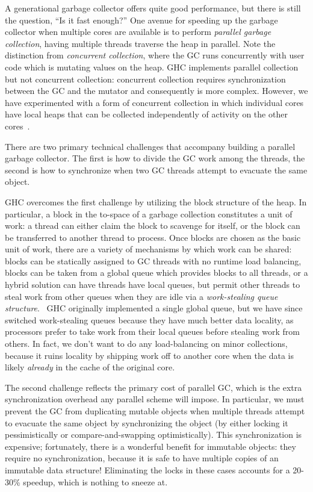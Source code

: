 A generational garbage collector offers quite good performance, but
there is still the question, ``Is it fast enough?''  One avenue for
speeding up the garbage collector when multiple cores are available is
to perform \emph{parallel garbage collection}, having multiple threads
traverse the heap in parallel.  Note the distinction from
\emph{concurrent collection}, where the GC runs concurrently with user
code which is mutating values on the heap.  GHC implements parallel
collection~\cite{Marlow:2008:PGG:1375634.1375637} but not concurrent
collection: concurrent collection requires synchronization between the
GC and the mutator and consequently is more complex.  However, we have
experimented with a form of concurrent collection in which individual
cores have local heaps that can be collected independently of activity
on the other cores~\cite{local-heaps}.

There are two primary technical challenges that accompany building a
parallel garbage collector.  The first is how to divide the GC work
among the threads, the second is how to synchronize when two GC threads
attempt to evacuate the same object.

GHC overcomes the first challenge by utilizing the block structure of
the heap.  In particular, a block in the to-space of a garbage
collection constitutes a unit of work: a thread can either claim the
block to scavenge for itself, or the block can be transferred to another
thread to process.  Once blocks are chosen as the basic unit of work,
there are a variety of mechanisms by which work can be shared: blocks
can be statically assigned to GC threads with no runtime load balancing,
blocks can be taken from a global queue which provides blocks to all
threads, or a hybrid solution can have threads have local queues, but
permit other threads to steal work from other queues when they are idle
via a \emph{work-stealing queue
structure}.~\cite{Arora:1998:TSM:277651.277678}  GHC originally
implemented a single global queue, but we have since switched
work-stealing queues because they have much better data locality, as
processors prefer to take work from their local queues before stealing
work from others.  In fact, we don't want to do any load-balancing on
minor collections, because it ruins locality by shipping work off to
another core when the data is likely \emph{already} in the cache of the
original core.~\cite{Marlow2009}

The second challenge reflects the primary cost of parallel GC, which is
the extra synchronization overhead any parallel scheme will impose.  In
particular, we must prevent the GC from duplicating mutable objects when
multiple threads attempt to evacuate the same object by synchronizing
the object (by either locking it pessimistically or compare-and-swapping
optimistically).  This synchronization is expensive; fortunately, there
is a wonderful benefit for immutable objects: they require no
synchronization, because it is safe to have multiple copies of an
immutable data structure!  Eliminating the locks in these cases accounts
for a 20-30\% speedup, which is nothing to sneeze at.

